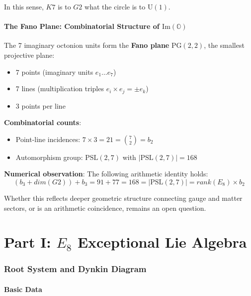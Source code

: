 \documentclass[11pt,a4paper]{article}
\newcommand{\E}{\mathrm{E}}
\newcommand{\Gtwo}{\mathrm{G}_2}
\newcommand{\Kseven}{K_7}
\newcommand{\dimE}{\mathrm{dim}}
\newcommand{\rk}{\mathrm{rank}}
\newcommand{\U}{\mathrm{U}}
\def\Gtwo{G2}%
\def\Kseven{K7}%
\def\E{E}%
\def\dimE{dim}%
\def\rk{rank}%
\begin{document}
In this sense, $\Kseven$ is to $\Gtwo$ what the circle is to $\U(1)$.

\subsection{The Fano Plane: Combinatorial Structure of $\mathrm{Im}(\mathbb{O})$}

The 7 imaginary octonion units form the \textbf{Fano plane} $\mathrm{PG}(2,2)$, the smallest projective plane:
\begin{itemize}
\item 7 points (imaginary units $e_1 \ldots e_7$)
\item 7 lines (multiplication triples $e_i \times e_j = \pm e_k$)
\item 3 points per line
\end{itemize}

\textbf{Combinatorial counts}:
\begin{itemize}
\item Point-line incidences: $7 \times 3 = 21 = \binom{7}{2} = b_2$
\item Automorphism group: $\mathrm{PSL}(2,7)$ with $|\mathrm{PSL}(2,7)| = 168$
\end{itemize}

\textbf{Numerical observation}: The following arithmetic identity holds:
$$(b_3 + \dimE(\Gtwo)) + b_3 = 91 + 77 = 168 = |\mathrm{PSL}(2,7)| = \rk(\E_8) \times b_2$$

Whether this reflects deeper geometric structure connecting gauge and matter sectors, or is an arithmetic coincidence, remains an open question.

\newpage
\part*{Part I: $\E_8$ Exceptional Lie Algebra}

\section{Root System and Dynkin Diagram}

\subsection{Basic Data}
\end{document}
